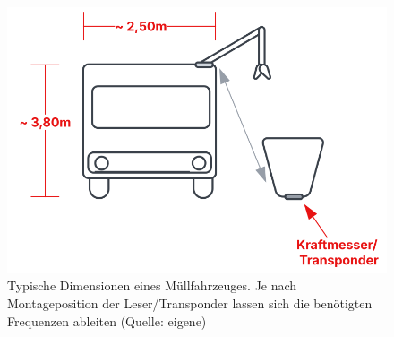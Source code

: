 \begin{figure}
    \centering
    \includegraphics[scale=0.6]{aufgabe 3/img/dimensionen.svg}
    \caption{Typische Dimensionen eines Müllfahrzeuges. Je nach Montageposition der Leser/Transponder lassen sich die benötigten Frequenzen ableiten (Quelle: eigene)}
    \label{fig:dimensionen}
\end{figure}